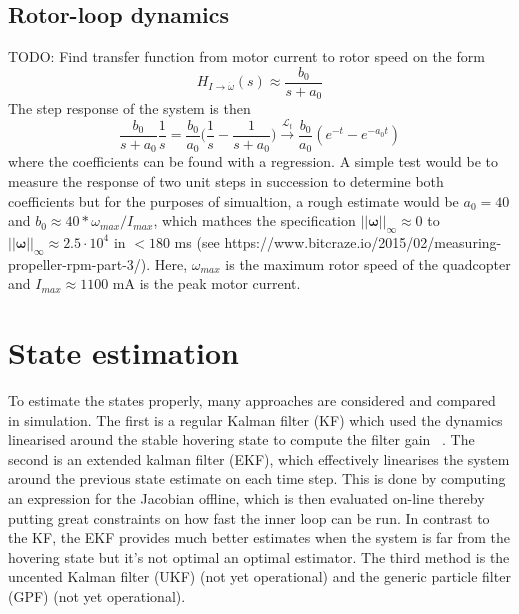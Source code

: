 \documentclass{article}
\begin{document}
\subsection{Rotor-loop dynamics}
TODO: Find transfer function from motor current to rotor speed on the form
\begin{equation}
H_{I\rightarrow \dot{\omega}}(s) \approx \frac{b_0}{s + a_0}
\end{equation}
The step response of the system is then
\begin{equation}
\frac{b_0}{s + a_0} \frac{1}{s} = \frac{b_0}{a_0}\Big(\frac{1}{s} - \frac{1}{s + a_0}\Big) \overset{\mathcal{L}_t}{\longrightarrow}
\frac{b_0}{a_0}(e^{-t} - e^{-a_0t})
\end{equation}
where the coefficients can be found with a regression. A simple test would be to measure the response of two unit steps in succession to determine both coefficients but for the purposes of simualtion, a rough estimate would be $a_0=40$ and $b_0 \approx 40*\omega_{max}/I_{max}$, which mathces the specification $||{\boldsymbol\omega}||_{\infty} \approx 0$ to $||{\boldsymbol\omega}||_{\infty} \approx 2.5\cdot 10^4$ in $< 180$ ms (see https://www.bitcraze.io/2015/02/measuring-propeller-rpm-part-3/). Here, $\omega_{max}$ is the maximum rotor speed of the quadcopter and $I_{max}\approx 1100$ mA is the peak motor current.

\section{State estimation}
To estimate the states properly, many approaches are considered and compared in simulation. The first is a regular Kalman filter (KF) which used the dynamics linearised around the stable hovering state to compute the filter gain ~\cite{glad2000control}. The second is an extended kalman filter (EKF), which effectively linearises the system around the previous state estimate on each time step. This is done by computing an expression for the Jacobian offline, which is then evaluated on-line thereby putting great constraints on how fast the inner loop can be run. In contrast to the KF, the EKF provides much better estimates when the system is far from the hovering state but it's not optimal an optimal estimator. The third method is the uncented Kalman filter (UKF) (not yet operational) and the generic particle filter (GPF) (not yet operational).
\end{document}
